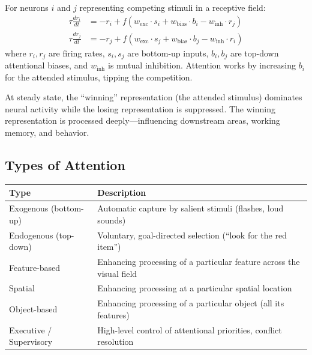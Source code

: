 \documentclass[11pt,a4paper]{report}
\begin{document}
\begin{mathbox}
\vspace{-6pt}
For neurons $i$ and $j$ representing competing stimuli in a receptive field:
\begin{align}
  \tau \frac{dr_i}{dt} &= -r_i + f\!\left(w_{\text{exc}} \cdot s_i + w_{\text{bias}} \cdot b_i - w_{\text{inh}} \cdot r_j\right) \label{eq:bc_i}\\[4pt]
  \tau \frac{dr_j}{dt} &= -r_j + f\!\left(w_{\text{exc}} \cdot s_j + w_{\text{bias}} \cdot b_j - w_{\text{inh}} \cdot r_i\right) \label{eq:bc_j}
\end{align}
where $r_i, r_j$ are firing rates, $s_i, s_j$ are bottom-up inputs, $b_i, b_j$ are top-down attentional biases, and $w_{\text{inh}}$ is mutual inhibition. Attention works by increasing $b_i$ for the attended stimulus, tipping the competition.
\vspace{-4pt}
\end{mathbox}

At steady state, the ``winning'' representation (the attended stimulus) dominates neural activity while the losing representation is suppressed. The winning representation is processed deeply---influencing downstream areas, working memory, and behavior.

\subsection{Types of Attention}

\begin{center}
\renewcommand{\arraystretch}{1.3}
\begin{tabular}{>{\raggedright}p{3.5cm} >{\raggedright\arraybackslash}p{9cm}}
  \toprule
  \textbf{Type} & \textbf{Description} \\
  \midrule
  Exogenous (bottom-up) & Automatic capture by salient stimuli (flashes, loud sounds) \\
  Endogenous (top-down) & Voluntary, goal-directed selection (``look for the red item'') \\
  Feature-based & Enhancing processing of a particular feature across the visual field \\
  Spatial & Enhancing processing at a particular spatial location \\
  Object-based & Enhancing processing of a particular object (all its features) \\
  Executive / Supervisory & High-level control of attentional priorities, conflict resolution \\
  \bottomrule
\end{tabular}
\end{center}
\end{document}
